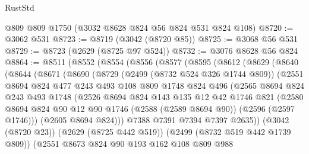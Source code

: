 \begin{lexlean}{RustStd}
\begin{coremodule}
    @809
    @809
    @1750
    (@3032 @8628 @824 @56 @824 @531 @824 @108)
@8720 := @3062 @531
@8723 := @8719 (@3042 (@8720 @85))
@8725 := @3068 @56 @531
@8729 := @8723 (@2629 (@8725 @97 @524))
@8732 := @3076 @8628 @56 @824
@8864 := @8511
    (@8552
      (@8554
        (@8556
          (@8577
            (@8595
              (@8612
                (@8629
                  (@8640
                    (@8644
                      (@8671
                        (@8690
                          (@8729
                            (@2499 (@8732 @524 @326 @1744 @809))
                            (@2551
                              @8694
                              @824
                              @477
                              @243
                              @493
                              @108
                              @809
                              @1748
                              @824
                              @496
                              (@2565
                                @8694
                                @824
                                @243
                                @493
                                @1748
                                (@2526
                                  @8694
                                  @824
                                  @143
                                  @135
                                  @12
                                  @42
                                  @1746
                                  @821
                                  (@2580
                                    @8694
                                    @824
                                    @90
                                    @12
                                    @90
                                    @1746
                                    (@2588 (@2589 @8694 @90))
                                    (@2596 (@2597 @1746)))
                                  (@2605 @8694 @824)))
                              @7388
                              @7391
                              @7394
                              @7397
                              @2635))
                          (@3042 (@8720 @23))
                          (@2629 (@8725 @442 @519))
                          (@2499 (@8732 @519 @442 @1739 @809))
                          (@2551
                            @8673
                            @824
                            @90
                            @193
                            @162
                            @108
                            @809
                            @988

\end{coremodule}
\end{lexlean}
